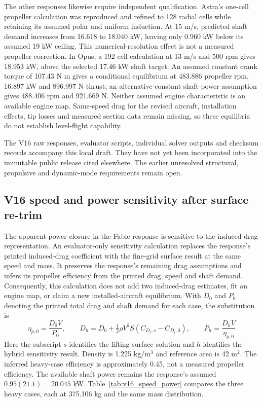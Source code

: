 \documentclass[10pt,letterpaper]{article}
\begin{document}
The other responses likewise require independent qualification. Astra's one-cell
propeller calculation was reproduced and refined to 128 radial cells while retaining
its assumed polar and uniform induction. At 15 m/s, predicted shaft demand increases
from 16.618 to 18.040 kW, leaving only 0.960 kW below its assumed 19 kW ceiling.
This numerical-resolution effect is not a measured propeller correction. In Opus,
a 192-cell calculation at 13 m/s and 500 rpm gives 18.953 kW, above the selected
17.46 kW shaft target. An assumed constant crank torque of 107.43 N m gives a
conditional equilibrium at 483.886 propeller rpm, 16.897 kW and 896.997 N thrust;
an alternative constant-shaft-power assumption gives 488.406 rpm and 921.669 N.
Neither assumed engine characteristic is an available engine map. Same-speed drag
for the revised aircraft, installation effects, tip losses and measured section data
remain missing, so these equilibria do not establish level-flight capability.

The V16 raw responses, evaluator scripts, individual solver outputs and checksum
records accompany this local draft. They have not yet been incorporated into the
immutable public release cited elsewhere. The earlier unresolved structural,
propulsive and dynamic-mode requirements remain open.


\subsection{V16 speed and power sensitivity after surface re-trim}
\label{sec:v16_power_speed}
The apparent power closure in the Fable response is sensitive to the induced-drag
representation. An evaluator-only sensitivity calculation replaces the response's
printed induced-drag coefficient with the fine-grid surface result at the same
speed and mass. It preserves the response's remaining drag assumptions and infers
its propeller efficiency from the printed drag, speed and shaft demand. Consequently,
this calculation does not add two induced-drag estimates, fit an engine map, or
claim a new installed-aircraft equilibrium. With $D_0$ and $P_0$ denoting the printed
total drag and shaft demand for each case, the substitution is
\begin{equation}
\eta_{p,0}=\frac{D_0 V}{P_0},\qquad
D_h=D_0+\tfrac12\rho V^2 S(C_{D_i,s}-C_{D_i,0}),\qquad
P_h=\frac{D_h V}{\eta_{p,0}}
\end{equation}
Here the subscript $s$ identifies the lifting-surface solution and $h$ identifies
the hybrid sensitivity result. Density is 1.225 kg/m$^3$ and reference area is
42 m$^2$. The inferred heavy-case efficiency is approximately 0.45, not a measured
propeller efficiency. The available shaft power remains the response's assumed
$0.95(21.1)=20.045$ kW. Table~\ref{tab:v16_speed_power} compares the three heavy
cases, each at 375.106 kg and the same mass distribution.
\end{document}
